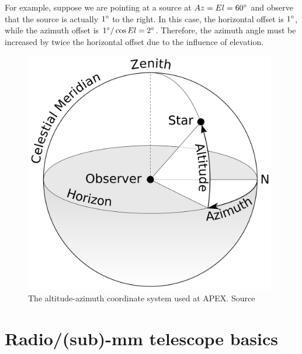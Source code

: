 For example, suppose we are pointing at a source at $Az=El=60^\circ$ and observe that the source is actually $1^\circ$ to the right.
In this case, the horizontal offset is $1^\circ$, while the azimuth offset is $1^\circ/\cos{El}=2^\circ$.
Therefore, the azimuth angle must be increased by twice the horizontal offset due to the influence of elevation.

\begin{figure}[H]
    \centering
    \includegraphics[width=0.98\textwidth]{Astronomy/Azimuth-Altitude_schematic.png}
    \caption{The altitude-azimuth coordinate system used at APEX. Source \cite{altaz_schematic}}
    \label{fig:altaz_coords}
\end{figure}




\section{Radio/(sub)-mm telescope basics}





